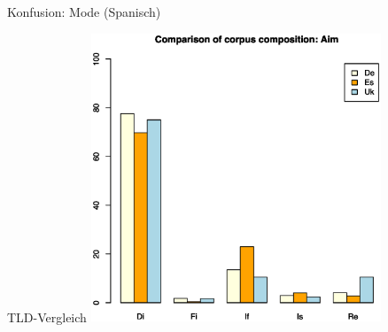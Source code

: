 \begin{frame}
  {Konfusion: Mode (Spanisch)}
  \vspace{0.5cm}
  \begin{center}
  \end{center}
\end{frame}

\begin{frame}
  {TLD-Vergleich}
  \centering
  \includegraphics[width=0.65\textwidth]{graphics/aim}
\end{frame}


